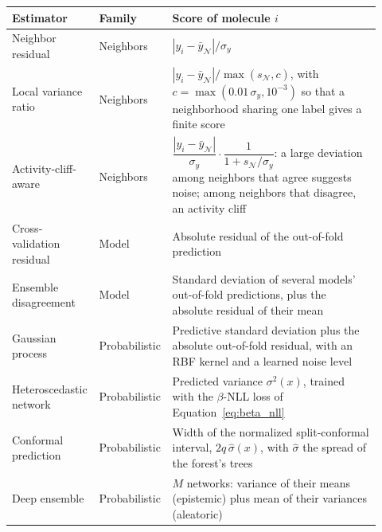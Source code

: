 \begin{table}[htbp]
\centering
\small
\begin{adjustbox}{max width=\textwidth,max totalheight=0.78\textheight}
\begin{tabular}{@{}P{0.2\linewidth}P{0.15\linewidth}P{0.57\linewidth}@{}}
\toprule
Estimator & Family & Score of molecule $i$ \\
\midrule
Neighbor residual & Neighbors & $|y_i - \bar y_{\mathcal{N}}| / \sigma_y$ \\
Local variance ratio & Neighbors & $|y_i - \bar y_{\mathcal{N}}| / \max(s_{\mathcal{N}}, c)$, with $c = \max(0.01\,\sigma_y, 10^{-3})$ so that a neighborhood sharing one label gives a finite score \\
Activity-cliff-aware & Neighbors & $\dfrac{|y_i - \bar y_{\mathcal{N}}|}{\sigma_y} \cdot \dfrac{1}{1 + s_{\mathcal{N}}/\sigma_y}$: a large deviation among neighbors that agree suggests noise; among neighbors that disagree, an activity cliff \citep{Dablander2023} \\
Cross-validation residual & Model & Absolute residual of the out-of-fold prediction \\
Ensemble disagreement & Model & Standard deviation of several models' out-of-fold predictions, plus the absolute residual of their mean \\
Gaussian process & Probabilistic & Predictive standard deviation plus the absolute out-of-fold residual, with an RBF kernel and a learned noise level \citep{Rasmussen2005} \\
Heteroscedastic network & Probabilistic & Predicted variance $\sigma^2(x)$, trained with the $\beta$-NLL loss of Equation~\ref{eq:beta_nll} \citep{Seitzer2022} \\
Conformal prediction & Probabilistic & Width of the normalized split-conformal interval, $2q\,\hat\sigma(x)$, with $\hat\sigma$ the spread of the forest's trees \citep{Papadopoulos2002, Lei2018} \\
Deep ensemble & Probabilistic & $M$ networks: variance of their means (epistemic) plus mean of their variances (aleatoric) \citep{lakshminarayanan2017} \\

\end{tabular}
\end{adjustbox}
\end{table}
